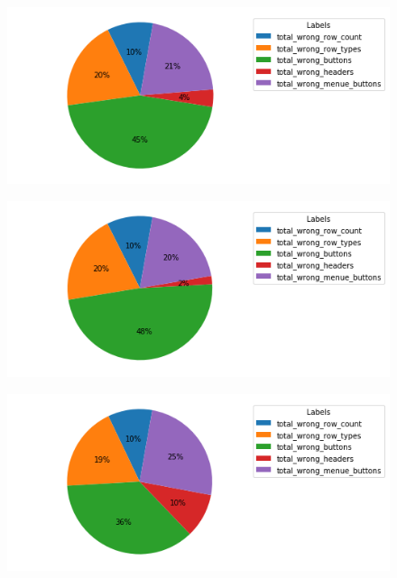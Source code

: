 \documentclass[pdftex,a4paper,halfparskip, article]{scrartcl}
\begin{document}
\begin{figure}
\centering
\begin{minipage}{.5\textwidth}
  \centering
  \includegraphics[width=1\linewidth]{predictions_bin13_total_error_types_pie_chart}
  \label{fig:fehler_gesamt_bin13}
\end{minipage}%
\begin{minipage}{.5\textwidth}
  \centering
  \includegraphics[width=1\linewidth]{predictions_bin13_excluded_p80_error_types_pie_chart}
  \label{fig:fehler_beste80_bin13}
\end{minipage}
\begin{minipage}{.5\textwidth}
  \centering
   \includegraphics[width=1\linewidth]{predictions_bin13_p80_error_types_pie_chart}
  \label{fig:fehler_schlechteste20_bin13}
\end{minipage}%
\end{figure}
\end{document}
